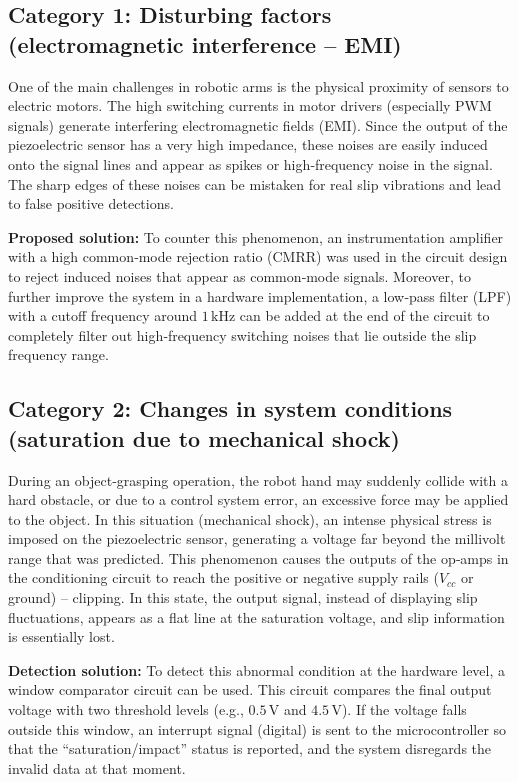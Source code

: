 \documentclass[12pt,a4paper]{article}
\begin{document}
\subsection{Category 1: Disturbing factors (electromagnetic interference – EMI)}
One of the main challenges in robotic arms is the physical proximity of sensors to electric motors. The high switching currents in motor drivers (especially PWM signals) generate interfering electromagnetic fields (EMI). Since the output of the piezoelectric sensor has a very high impedance, these noises are easily induced onto the signal lines and appear as spikes or high‑frequency noise in the signal. The sharp edges of these noises can be mistaken for real slip vibrations and lead to false positive detections.

\textbf{Proposed solution:} To counter this phenomenon, an instrumentation amplifier with a high common‑mode rejection ratio (CMRR) was used in the circuit design to reject induced noises that appear as common‑mode signals. Moreover, to further improve the system in a hardware implementation, a low‑pass filter (LPF) with a cutoff frequency around $1 \, \text{kHz}$ can be added at the end of the circuit to completely filter out high‑frequency switching noises that lie outside the slip frequency range.

\subsection{Category 2: Changes in system conditions (saturation due to mechanical shock)}
During an object‑grasping operation, the robot hand may suddenly collide with a hard obstacle, or due to a control system error, an excessive force may be applied to the object. In this situation (mechanical shock), an intense physical stress is imposed on the piezoelectric sensor, generating a voltage far beyond the millivolt range that was predicted.
This phenomenon causes the outputs of the op‑amps in the conditioning circuit to reach the positive or negative supply rails ($V_{cc}$ or ground) – clipping. In this state, the output signal, instead of displaying slip fluctuations, appears as a flat line at the saturation voltage, and slip information is essentially lost.

\textbf{Detection solution:} To detect this abnormal condition at the hardware level, a window comparator circuit can be used. This circuit compares the final output voltage with two threshold levels (e.g., $0.5 \, \text{V}$ and $4.5 \, \text{V}$). If the voltage falls outside this window, an interrupt signal (digital) is sent to the microcontroller so that the “saturation/impact” status is reported, and the system disregards the invalid data at that moment.
\end{document}
